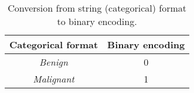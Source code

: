 \begin{table}[h]
\centering
\begin{tabular}{|c|c|}
\hline
\textbf{Categorical format} & \textbf{Binary encoding} \\ \hline
\textit{Benign}             & 0                        \\ \hline
\textit{Malignant}          & 1                        \\ \hline
\end{tabular}
\caption{Conversion from string (categorical) format to binary encoding.}
\label{tab:binary-encoding-example}
\end{table}